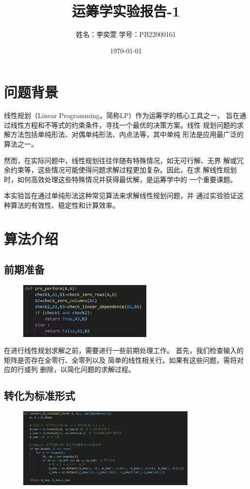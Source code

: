 \documentclass[10pt,a4paper,oneside]{article}
\title{\bf 运筹学实验报告-1}
\author{姓名：李奕萱  学号：PB22000161 }
\date{\today}
\begin{document}
\maketitle

\section{问题背景}

线性规划（Linear Programming，简称LP）作为运筹学的核心工具之一，
旨在通过线性方程和不等式的约束条件，寻找一个最优的决策方案。线性
规划问题的求解方法包括单纯形法、对偶单纯形法、内点法等，其中单纯
形法是应用最广泛的算法之一。

然而，在实际问题中，线性规划往往伴随有特殊情况，如无可行解、无界
解或冗余约束等，这些情况可能使得问题求解过程更加复杂。因此，在求
解线性规划时，如何高效处理这些特殊情况并获得最优解，是运筹学中的
一个重要课题。

本实验旨在通过单纯形法这种常见算法来求解线性规划问题，并
通过实验验证这种算法的有效性、稳定性和计算效率。

\section{算法介绍}

\subsection{前期准备}

\begin{figure}[H]
    \centering
    \includegraphics[width=0.6\textwidth]{屏幕截图 2024-11-05 104451.png}
\end{figure}

在进行线性规划求解之前，需要进行一些前期处理工作。
首先，我们检查输入的矩阵是否存在全零行、全零列以及
简单的线性相关行。如果有这些问题，需将对应的行或列
删除，以简化问题的求解过程。

\subsection{转化为标准形式}

\begin{figure}[H]
    \centering
    \includegraphics[width=0.8\textwidth]{屏幕截图 2024-11-05 104535.png}
\end{figure}
\end{document}
